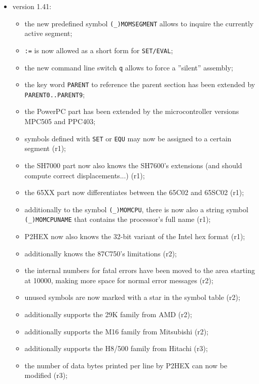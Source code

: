 \documentclass[12pt,twoside]{report}
\newcommand{\tty}[1]{{\tt #1}}
\newcommand{\predefsym}[1]{{\tt (\_)#1}}
\begin{document}
\begin{itemize}
\item{version 1.41:
      \begin{itemize}
      \item{the new predefined symbol \predefsym{MOMSEGMENT} allows to
            inquire the currently active segment;}
      \item{\tty{:=} is now allowed as a short form for \tty{SET/EVAL};}
      \item{the new command line switch \tty{q} allows to force a
            ''silent'' assembly;}
      \item{the key word \tty{PARENT} to reference the parent section
            has been extended by \tty{PARENT0..PARENT9};}
      \item{the PowerPC part has been extended by the
            microcontroller versions MPC505 and PPC403;}
      \item{symbols defined with \tty{SET} or \tty{EQU} may now be assigned
            to a certain segment (r1);}
      \item{the SH7000 part now also knows the SH7600's
            extensions (and should compute correct
            displacements...) (r1);}
      \item{the 65XX part now differentiates between the 65C02
            and 65SC02 (r1);}
      \item{additionally to the symbol \predefsym{MOMCPU}, there is now also
            a string symbol \predefsym{MOMCPUNAME} that contains the
            processor's full name (r1);}
      \item{P2HEX now also knows the 32-bit variant of the Intel
            hex format (r1);}
      \item{additionally knows the 87C750's limitations (r2);}
      \item{the internal numbers for fatal errors have been moved
            to the area starting at 10000, making more space for
            normal error messages (r2);}
      \item{unused symbols are now marked with a star in the
            symbol table (r2);}
      \item{additionally supports the 29K family from AMD (r2);}
      \item{additionally supports the M16 family from Mitsubishi
            (r2);}
      \item{additionally supports the H8/500 family from Hitachi
            (r3);}
      \item{the number of data bytes printed per line by P2HEX
            can now be modified (r3);}

\end{itemize}}
\end{itemize}
\end{document}
